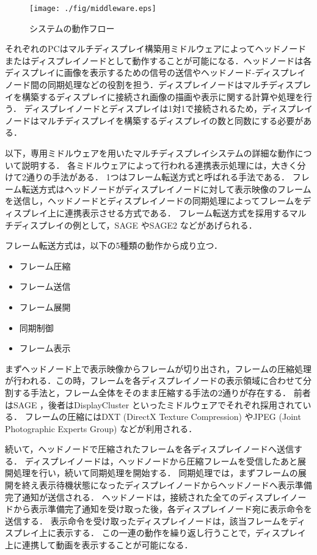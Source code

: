 \documentclass[12pt,a4paper]{jbook}
\begin{document}
\begin{figure}[htbp]
 \texttt{[image: ./fig/middleware.eps]}
 \caption{システムの動作フロー}
 \label{fig.1}
\end{figure}

それぞれのPCはマルチディスプレイ構築用ミドルウェアによってヘッドノードまたはディスプレイノードとして動作することが可能になる．ヘッドノードは各ディスプレイに画像を表示するための信号の送信やヘッドノード-ディスプレイノード間の同期処理などの役割を担う．ディスプレイノードはマルチディスプレイを構築するディスプレイに接続され画像の描画や表示に関する計算や処理を行う．
ディスプレイノードとディスプレイは1対1で接続されるため，ディスプレイノードはマルチディスプレイを構築するディスプレイの数と同数にする必要がある．

以下，専用ミドルウェアを用いたマルチディスプレイシステムの詳細な動作について説明する．
各ミドルウェアによって行われる連携表示処理には，大きく分けて2通りの手法がある．
1つはフレーム転送方式と呼ばれる手法である．
フレーム転送方式はヘッドノードがディスプレイノードに対して表示映像のフレームを送信し，ヘッドノードとディスプレイノードの同期処理によってフレームをディスプレイ上に連携表示させる方式である．
フレーム転送方式を採用するマルチディスプレイの例として，SAGE \cite{sage}やSAGE2 \cite{sage2}などがあげられる．

フレーム転送方式は，以下の5種類の動作から成り立つ．

\begin{itemize}
    \item フレーム圧縮
    \item フレーム送信
    \item フレーム展開
    \item 同期制御
    \item フレーム表示
  \end{itemize}

まずヘッドノード上で表示映像からフレームが切り出され，フレームの圧縮処理が行われる．この時，フレームを各ディスプレイノードの表示領域に合わせて分割する手法と，フレーム全体をそのまま圧縮する手法の2通りが存在する．
前者はSAGE \cite{sage}，後者はDisplayCluster \cite{displaycluster}といったミドルウェアでそれぞれ採用されている．
フレームの圧縮にはDXT (DirectX Texture Compression) \cite{dxt}やJPEG (Joint Photographic Experts Group) \cite{jpeg}などが利用される．

続いて，ヘッドノードで圧縮されたフレームを各ディスプレイノードへ送信する．
ディスプレイノードは，ヘッドノードから圧縮フレームを受信したあと展開処理を行い，続いて同期処理を開始する．
同期処理では，まずフレームの展開を終え表示待機状態になったディスプレイノードからヘッドノードへ表示準備完了通知が送信される．
ヘッドノードは，接続された全てのディスプレイノードから表示準備完了通知を受け取った後，各ディスプレイノード宛に表示命令を送信する．
表示命令を受け取ったディスプレイノードは，該当フレームをディスプレイ上に表示する．
この一連の動作を繰り返し行うことで，ディスプレイ上に連携して動画を表示することが可能になる．
\end{document}
